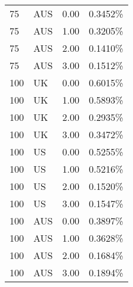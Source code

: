 \begin{table}[ht]
\begin{tabular}{llrl}
  75 & AUS & 0.00 & 0.3452\% \\ 
  75 & AUS & 1.00 & 0.3205\% \\ 
  75 & AUS & 2.00 & 0.1410\% \\ 
  75 & AUS & 3.00 & 0.1512\% \\ 
  100 & UK & 0.00 & 0.6015\% \\ 
  100 & UK & 1.00 & 0.5893\% \\ 
  100 & UK & 2.00 & 0.2935\% \\ 
  100 & UK & 3.00 & 0.3472\% \\ 
  100 & US & 0.00 & 0.5255\% \\ 
  100 & US & 1.00 & 0.5216\% \\ 
  100 & US & 2.00 & 0.1520\% \\ 
  100 & US & 3.00 & 0.1547\% \\ 
  100 & AUS & 0.00 & 0.3897\% \\ 
  100 & AUS & 1.00 & 0.3628\% \\ 
  100 & AUS & 2.00 & 0.1684\% \\ 
  100 & AUS & 3.00 & 0.1894\% \\ 
   \hline
\end{tabular}
\end{table}
